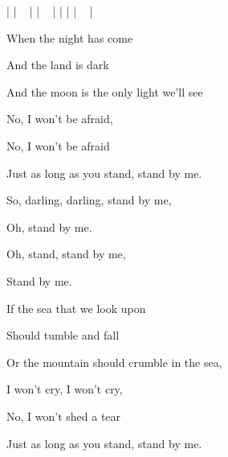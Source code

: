 

|  | ~ |   | ~ |   |   |   | ~ |

\zs
When the night has come

And the land is dark

And the moon is the only light we'll see

No, I won't be afraid,

No, I won't be afraid

Just as long as you stand, stand by me.
\ks

\zr
So, darling, darling, stand by me,

Oh, stand by me.

Oh, stand, stand by me,

Stand by me.
\kr

\zs
  If the sea that we look upon

  Should tumble and fall

  Or the mountain should crumble in the sea,

  I won't cry, I won't cry,

  No, I won't shed a tear

  Just as long as you stand, stand by me.
\ks

\kp
